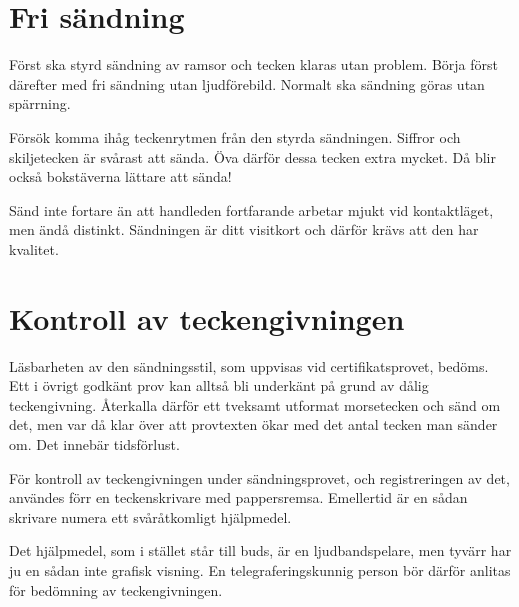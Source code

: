 \section{Fri sändning}

Först ska styrd sändning av ramsor och tecken klaras utan problem.
Börja först därefter med fri sändning utan ljudförebild.
Normalt ska sändning göras utan spärrning.

Försök komma ihåg teckenrytmen från den styrda sändningen.
Siffror och skiljetecken är svårast att sända.
Öva därför dessa tecken extra mycket.
Då blir också bokstäverna lättare att sända!

Sänd inte fortare än att handleden fortfarande arbetar mjukt vid kontaktläget,
men ändå distinkt.
Sändningen är ditt visitkort och därför krävs att den har kvalitet.


\section[Teckengivning]{Kontroll av teckengivningen}

Läsbarheten av den sändningsstil, som uppvisas vid certifikatsprovet, bedöms.
Ett i övrigt godkänt prov kan alltså bli underkänt på grund av dålig
teckengivning.
Återkalla därför ett tveksamt utformat morsetecken och sänd om det, men var då
klar över att provtexten ökar med det antal tecken man sänder om.
Det innebär tidsförlust.

För kontroll av teckengivningen under sändningsprovet, och registreringen av
det, användes förr en teckenskrivare med pappersremsa.
Emellertid är en sådan skrivare numera ett svåråtkomligt hjälpmedel.

Det hjälpmedel, som i stället står till buds, är en ljudbandspelare, men tyvärr
har ju en sådan inte grafisk visning.
En telegraferingskunnig person bör därför anlitas för bedömning av
teckengivningen.

